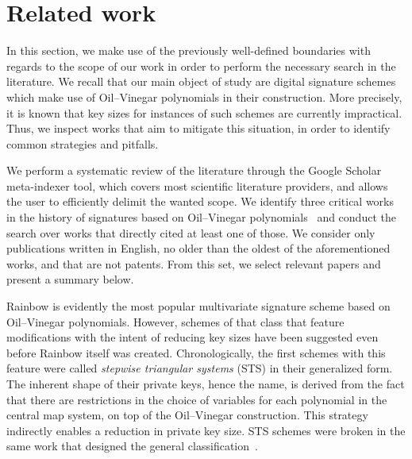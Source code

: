 \documentclass[draft, 12pt, a4paper, oneside]{memoir}
\begin{document}

\section{Related work}\label{sec:related}

In this section, we make use of the previously well-defined boundaries with regards to the scope of our work in order to perform the necessary search in the literature. We recall that our main object of study are digital signature schemes which make use of Oil--Vinegar polynomials in their construction. More precisely, it is known that key sizes for instances of such schemes are currently impractical. Thus, we inspect works that aim to mitigate this situation, in order to identify common strategies and pitfalls.

We perform a systematic review of the literature through the Google Scholar meta-indexer tool, which covers most scientific literature providers, and allows the user to efficiently delimit the wanted scope. We identify three critical works in the history of signatures based on Oil--Vinegar polynomials~\cite{Patarin:199709,Kipnis:199904,Ding:200506} and conduct the search over works that directly cited at least one of those. We consider only publications written in English, no older than the oldest of the aforementioned works, and that are not patents. From this set, we select relevant papers and present a summary below.


Rainbow is evidently the most popular multivariate signature scheme based on Oil--Vinegar polynomials. However, schemes of that class that feature modifications with the intent of reducing key sizes have been suggested even before Rainbow itself was created. Chronologically, the first schemes with this feature were called \emph{stepwise triangular systems} (STS) in their generalized form. The inherent shape of their private keys, hence the name, is derived from the fact that there are restrictions in the choice of variables for each polynomial in the central map system, on top of the Oil--Vinegar construction. This strategy indirectly enables a reduction in private key size. STS schemes were broken in the same work that designed the general classification~\cite{}.
\end{document}
